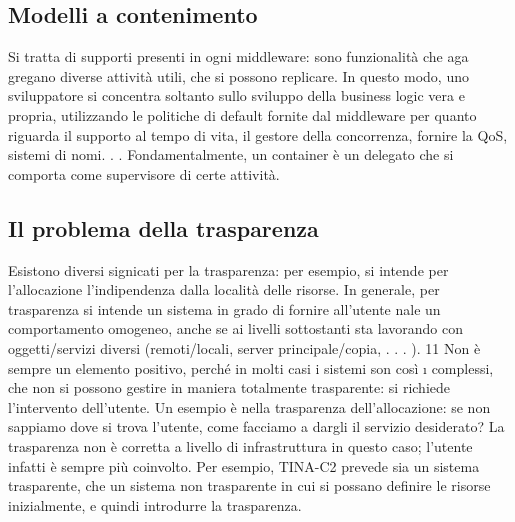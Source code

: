 \subsection{Modelli a contenimento}
Si tratta di supporti presenti in ogni middleware: sono funzionalità che aga
gregano diverse attività utili, che si possono replicare. In questo modo, uno
sviluppatore si concentra soltanto sullo sviluppo della business logic vera e
propria, utilizzando le politiche di default fornite dal middleware per quanto
riguarda il supporto al tempo di vita, il gestore della concorrenza, fornire la
QoS, sistemi di nomi. . . Fondamentalmente, un container è un delegato che si
comporta come supervisore di certe attività.
\subsection{Il problema della trasparenza}
Esistono diversi signicati per la trasparenza: per esempio, si intende per l'allocazione l'indipendenza dalla località
delle risorse. In generale, per trasparenza si
intende un sistema in grado di fornire all'utente nale un comportamento omogeneo, anche se ai livelli sottostanti sta
lavorando con oggetti/servizi diversi
(remoti/locali, server principale/copia, . . . ).
11
Non è sempre un elemento positivo, perché in molti casi i sistemi son così
\i{}
complessi, che non si possono gestire in maniera totalmente trasparente: si
richiede l'intervento dell'utente. Un esempio è nella trasparenza dell'allocazione:
se non sappiamo dove si trova l'utente, come facciamo a dargli il servizio desiderato? La trasparenza non è corretta a
livello di infrastruttura in questo caso;
l'utente infatti è sempre più coinvolto.
Per esempio, TINA-C2 prevede sia un sistema trasparente, che un sistema
non trasparente in cui si possano definire le risorse inizialmente, e quindi introdurre la trasparenza.
